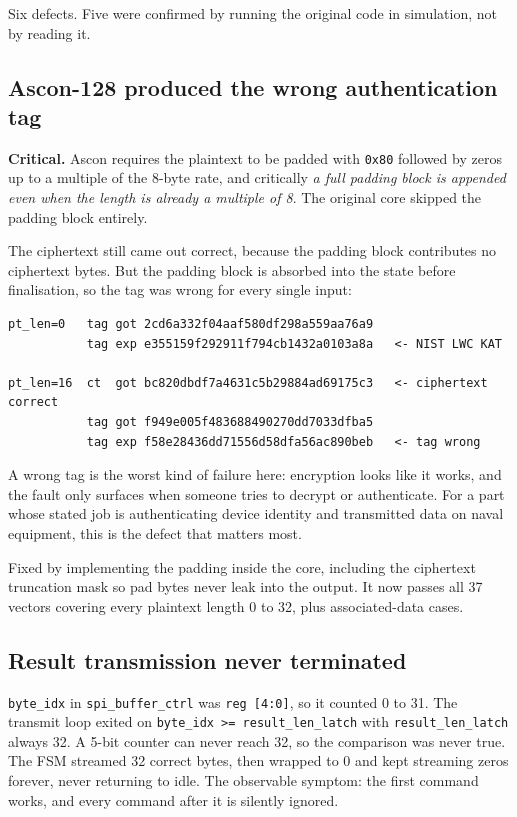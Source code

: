 \documentclass[11pt,a4paper]{article}
\begin{document}
Six defects. Five were confirmed by running the original code in simulation,
not by reading it.

\subsection{Ascon-128 produced the wrong authentication tag}

\textbf{Critical.} Ascon requires the plaintext to be padded with \texttt{0x80}
followed by zeros up to a multiple of the 8-byte rate, and critically \emph{a
full padding block is appended even when the length is already a multiple of
8}. The original core skipped the padding block entirely.

The ciphertext still came out correct, because the padding block contributes no
ciphertext bytes. But the padding block is absorbed into the state before
finalisation, so the tag was wrong for every single input:

{\small
\begin{verbatim}
pt_len=0   tag got 2cd6a332f04aaf580df298a559aa76a9
           tag exp e355159f292911f794cb1432a0103a8a   <- NIST LWC KAT

pt_len=16  ct  got bc820dbdf7a4631c5b29884ad69175c3   <- ciphertext correct
           tag got f949e005f483688490270dd7033dfba5
           tag exp f58e28436dd71556d58dfa56ac890beb   <- tag wrong
\end{verbatim}}

A wrong tag is the worst kind of failure here: encryption looks like it works,
and the fault only surfaces when someone tries to decrypt or authenticate. For
a part whose stated job is authenticating device identity and transmitted data
on naval equipment, this is the defect that matters most.

Fixed by implementing the padding inside the core, including the ciphertext
truncation mask so pad bytes never leak into the output. It now passes all 37
vectors covering every plaintext length 0 to 32, plus associated-data cases.

\subsection{Result transmission never terminated}

\texttt{byte\_idx} in \texttt{spi\_buffer\_ctrl} was \texttt{reg [4:0]}, so it
counted 0 to 31. The transmit loop exited on
\texttt{byte\_idx >= result\_len\_latch} with \texttt{result\_len\_latch}
always 32. A 5-bit counter can never reach 32, so the comparison was never
true. The FSM streamed 32 correct bytes, then wrapped to 0 and kept streaming
zeros forever, never returning to idle. The observable symptom: the first
command works, and every command after it is silently ignored.
\end{document}
